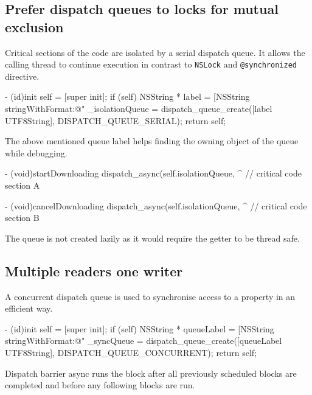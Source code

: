 \documentclass[10pt]{extarticle}
\newenvironment{importantlisting}
{\mdframed[middlelinewidth=0.5pt, middlelinecolor=MatisseColor, skipabove=15pt]{\textbf{Important:}}}
{\endmdframed\vspace{12pt}}
\newcommand{\inlinecode}[1]{{\textcolor{TundoraColor}{\texttt{#1}}}}
\begin{document}
\subsection{Prefer dispatch queues to locks for mutual exclusion}

Critical sections of the code are isolated by a serial dispatch queue. It allows the calling thread to continue execution in contrast to \inlinecode{NSLock} and \inlinecode{@synchronized} directive.

\begin{codelisting}
- (id)init
{
    self = [super init];
    if (self) {
        NSString * label = [NSString stringWithFormat:@"%
        _isolationQueue = dispatch_queue_create([label UTF8String], DISPATCH_QUEUE_SERIAL);
    }
    return self;
}
\end{codelisting}

The above mentioned queue label helps finding the owning object of the queue while debugging.

\begin{codelisting}
- (void)startDownloading
{
    dispatch_async(self.isolationQueue, ^{
        // critical code section A
    }
}

- (void)cancelDownloading
{
    dispatch_async(self.isolationQueue, ^{
        // critical code section B
    }
}
\end{codelisting}

\begin{importantlisting}
The queue is not created lazily as it would require the getter to be thread safe.
\end{importantlisting}


\subsection{Multiple readers one writer}

A concurrent dispatch queue is used to synchronise access to a property in an efficient way.

\begin{codelisting}
- (id)init
{
    self = [super init];
    if (self) {
        NSString * queueLabel = [NSString stringWithFormat:@"%
        _syncQueue = dispatch_queue_create([queueLabel UTF8String], DISPATCH_QUEUE_CONCURRENT);
    }
    return self;
}
\end{codelisting}

Dispatch barrier async runs the block after all previously scheduled blocks are completed and before any following blocks are run.
\end{document}
